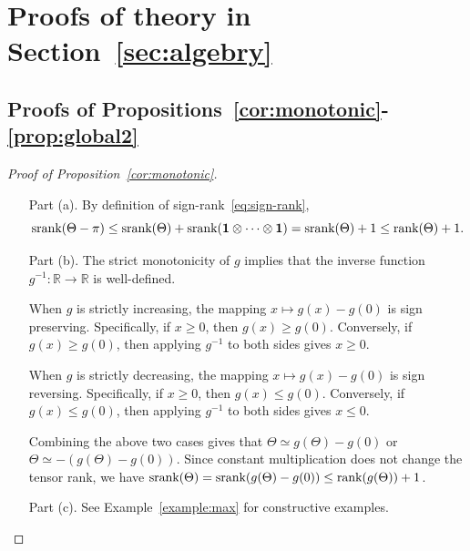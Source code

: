 \documentclass[twoside,11pt]{article}
\theoremstyle{definition}
\def\srank{\textup{srank}}
\def\rank{\textup{rank}}
\begin{document}
\section{Proofs of theory in Section~\ref{sec:algebry}}\label{sec:proofalg}

\subsection{Proofs of Propositions~\ref{cor:monotonic}-\ref{prop:global2}}
\begin{proof}[Proof of Proposition~\ref{cor:monotonic}] 
\begin{enumerate}[label={2.\arabic*},wide, labelindent=0pt]
\item[Part (a).] By definition of sign-rank~\eqref{eq:sign-rank},
\[
\srank(\Theta-\pi)\leq \srank(\Theta)+\srank(\mathbf{1}\otimes \cdots \otimes \mathbf{1})=\srank(\Theta)+1\leq \rank(\Theta)+1.
\]
\item[Part (b).] The strict monotonicity of $g$ implies that the inverse function $g^{-1}\colon \mathbb{R}\to \mathbb{R}$ is well-defined. 

When $g$ is strictly increasing, the mapping $x\mapsto g(x)-g(0)$ is sign preserving. Specifically, if $x\geq 0$, then $g(x)\geq g(0)$. Conversely, if $g(x)\geq g(0)$, then applying $g^{-1}$ to both sides gives $x\geq 0$. 

When $g$ is strictly decreasing, the mapping $x\mapsto g(x)-g(0)$ is sign reversing. Specifically, if $x\geq 0$, then $g(x)\leq g(0)$. Conversely, if $g(x)\leq g(0)$, then applying $g^{-1}$ to both sides gives $x\leq 0$.

Combining the above two cases gives that $\Theta\simeq g(\Theta)-g(0)$ or $\Theta\simeq -(g(\Theta)-g(0))$. Since constant multiplication  does not change the tensor rank,  we have $\srank(\Theta)=\srank(g(\Theta)-g(0))\leq \rank (g(\Theta))+1$. 
\item[Part (c).] See Example~\ref{example:max} for constructive examples.
\end{enumerate}
\end{proof}
\end{document}
